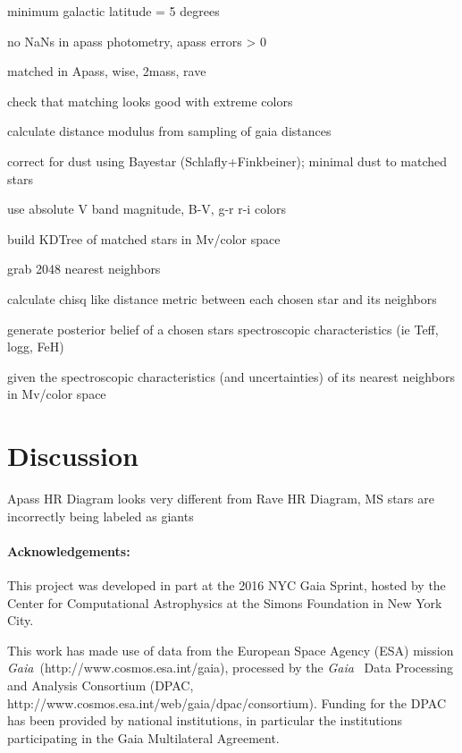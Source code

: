 \documentclass[11pt,letterpaper]{article}
\newcommand{\acronym}[1]{{\small{#1}}}
\newcommand{\project}[1]{\textsl{#1}}
\newcommand{\Gaia}{\project{Gaia}}
\begin{document}
minimum galactic latitude = 5 degrees

no NaNs in apass photometry, apass errors > 0

matched in Apass, wise, 2mass, rave

check that matching looks good with extreme colors

calculate distance modulus from sampling of gaia distances

correct for dust using Bayestar (Schlafly+Finkbeiner); minimal dust to matched stars

use absolute V band magnitude, B-V, g-r r-i colors

build KDTree of matched stars in Mv/color space

grab 2048 nearest neighbors

calculate chisq like distance metric between each chosen star and its neighbors

generate posterior belief of a chosen stars spectroscopic characteristics (ie Teff, logg, FeH)

given the spectroscopic characteristics (and uncertainties) of its nearest neighbors in Mv/color space

\section{Discussion}

Apass HR Diagram looks very different from Rave HR Diagram, MS stars are incorrectly being labeled as giants

\paragraph{Acknowledgements:}
This project was developed in part at the 2016 NYC Gaia Sprint, hosted
by the Center for Computational Astrophysics at the Simons Foundation
in New York City.

This work has made use of data from the European Space Agency (ESA)
mission \Gaia\ (http://www.cosmos.esa.int/gaia), processed by the \Gaia\ %
Data Processing and Analysis Consortium (\acronym{DPAC},
http://www.cosmos.esa.int/web/gaia/dpac/consortium). Funding for the
\acronym{DPAC} has been provided by national institutions, in particular the
institutions participating in the Gaia Multilateral Agreement.
\end{document}
